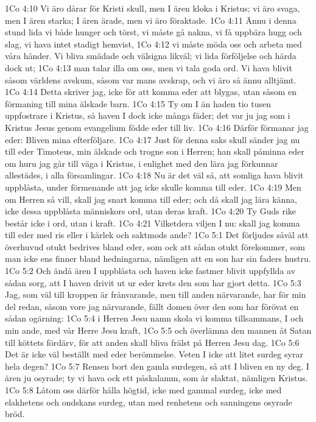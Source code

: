1Co 4:10  Vi äro dårar för Kristi skull, men I ären kloka i Kristus; vi äro svaga, men I ären starka; I ären ärade, men vi äro föraktade.
1Co 4:11  Ännu i denna stund lida vi både hunger och törst, vi måste gå nakna, vi få uppbära hugg och slag, vi hava intet stadigt hemvist,
1Co 4:12  vi måste möda oss och arbeta med våra händer. Vi bliva smädade och välsigna likväl; vi lida förföljelse och härda dock ut;
1Co 4:13  man talar illa om oss, men vi tala goda ord. Vi hava blivit såsom världens avskum, såsom var mans avskrap, och vi äro så ännu alltjämt.
1Co 4:14  Detta skriver jag, icke för att komma eder att blygas, utan såsom en förmaning till mina älskade barn.
1Co 4:15  Ty om I än haden tio tusen uppfostrare i Kristus, så haven I dock icke många fäder; det var ju jag som i Kristus Jesus genom evangelium födde eder till liv.
1Co 4:16  Därför förmanar jag eder: Bliven mina efterföljare.
1Co 4:17  Just för denna saks skull sänder jag nu till eder Timoteus, min älskade och trogne son i Herren; han skall påminna eder om huru jag går till väga i Kristus, i enlighet med den lära jag förkunnar allestädes, i alla församlingar.
1Co 4:18  Nu är det väl så, att somliga hava blivit uppblåsta, under förmenande att jag icke skulle komma till eder.
1Co 4:19  Men om Herren så vill, skall jag snart komma till eder; och då skall jag lära känna, icke dessa uppblåsta människors ord, utan deras kraft.
1Co 4:20  Ty Guds rike består icke i ord, utan i kraft.
1Co 4:21  Vilketdera viljen I nu: skall jag komma till eder med ris eller i kärlek och saktmods ande?
1Co 5:1  Det förljudes såväl att överhuvud otukt bedrives bland eder, som ock att sådan otukt förekommer, som man icke ens finner bland hedningarna, nämligen att en son har sin faders hustru.
1Co 5:2  Och ändå ären I uppblåsta och haven icke fastmer blivit uppfyllda av sådan sorg, att I haven drivit ut ur eder krets den som har gjort detta.
1Co 5:3  Jag, som väl till kroppen är frånvarande, men till anden närvarande, har för min del redan, såsom vore jag närvarande, fällt domen över den som har förövat en sådan ogärning:
1Co 5:4  i Herren Jesu namn skola vi komma tillsammans, I och min ande, med vår Herre Jesu kraft,
1Co 5:5  och överlämna den mannen åt Satan till köttets fördärv, för att anden skall bliva frälst på Herren Jesu dag.
1Co 5:6  Det är icke väl beställt med eder berömmelse. Veten I icke att litet surdeg syrar hela degen?
1Co 5:7  Rensen bort den gamla surdegen, så att I bliven en ny deg. I ären ju osyrade; ty vi hava ock ett påskalamm, som är slaktat, nämligen Kristus.
1Co 5:8  Låtom oss därför hålla högtid, icke med gammal surdeg, icke med elakhetens och ondskans surdeg, utan med renhetens och sanningens osyrade bröd.
